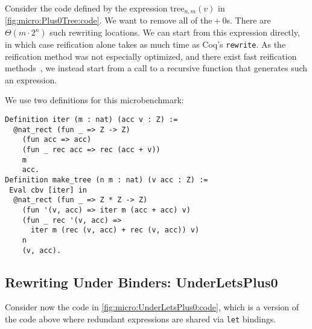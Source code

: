 \documentclass[a4paper,USenglish,cleveref,autoref,thm-restate]{lipics-v2021}
\newcommand{\todo}[1]{\textcolor{red}{\textbf{TODO: #1}}}
\begin{document}
Consider the code defined by the expression $\text{tree}_{n,m}(v)$ in \autoref{fig:micro:Plus0Tree:code}.
We want to remove all of the${}+0$s.
There are $\Theta(m \cdot 2^n)$ such rewriting locations.
We can start from this expression directly, in which case reification alone takes as much time as Coq's \texttt{rewrite}.
As the reification method was not especially optimized, and there exist fast reification methods~\cite{ReificationITP18}, we instead start from a call to a recursive function that generates such an expression.


We use two definitions for this microbenchmark:
\begin{verbatim}
Definition iter (m : nat) (acc v : Z) :=
  @nat_rect (fun _ => Z -> Z)
    (fun acc => acc)
    (fun _ rec acc => rec (acc + v))
    m
    acc.
Definition make_tree (n m : nat) (v acc : Z) :=
 Eval cbv [iter] in
  @nat_rect (fun _ => Z * Z -> Z)
    (fun '(v, acc) => iter m (acc + acc) v)
    (fun _ rec '(v, acc) =>
      iter m (rec (v, acc) + rec (v, acc)) v)
    n
    (v, acc).
\end{verbatim}

\subsection{Rewriting Under Binders: UnderLetsPlus0}\label{sec:UnderLetsPlus0-more}\label{sec:micro:UnderLetsPlus0}

Consider now the code in \autoref{fig:micro:UnderLetsPlus0:code}, which is a version of the code above where redundant expressions are shared via \texttt{let} bindings.
\end{document}
